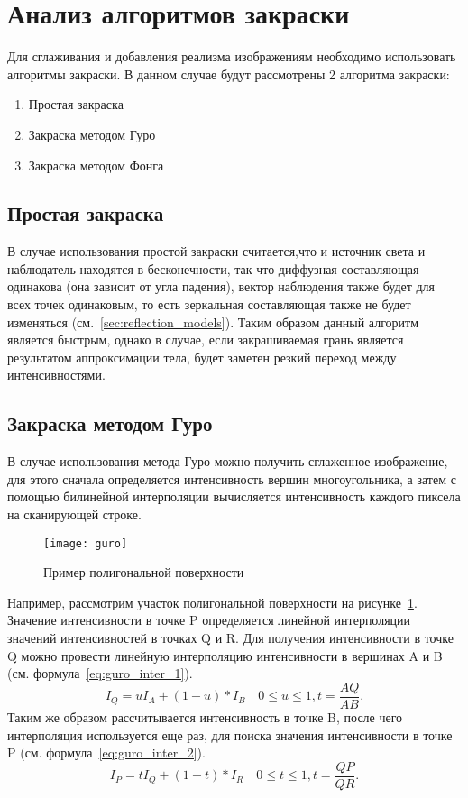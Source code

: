 \section{Анализ алгоритмов закраски}
Для сглаживания и добавления реализма изображениям  необходимо использовать алгоритмы закраски.
В данном случае будут рассмотрены 2 алгоритма закраски:
\begin{enumerate}
	\item Простая закраска
	\item Закраска методом Гуро
	\item Закраска методом Фонга
\end{enumerate}

\subsection{Простая закраска}
В случае использования простой закраски считается,что и источник света и наблюдатель находятся в бесконечности,
так что диффузная составляющая одинакова (она зависит от угла падения), вектор наблюдения также будет для всех точек одинаковым, то есть зеркальная составляющая
также не будет изменяться (см.~\ref{sec:reflection_models}). 
Таким образом данный алгоритм является быстрым, однако в случае, если закрашиваемая грань является результатом аппроксимации тела, 
будет заметен резкий переход между интенсивностями. \cite{Rodgers}


\subsection{Закраска методом Гуро}
В случае использования метода Гуро можно получить сглаженное изображение, для этого сначала определяется интенсивность вершин многоугольника, а
затем с помощью билинейной интерполяции вычисляется интенсивность каждого пиксела на сканирующей строке.

\begin{figure}[H]
	\centering
	\texttt{[image: guro]}
	\caption{Пример полигональной поверхности}
	\label{fig:guro_polygon}
\end{figure} 

Например, рассмотрим участок полигональной поверхности на рисунке~\ref{fig:guro_polygon}.
Значение интенсивности в точке P
определяется линейной интерполяции значений интенсивностей в точках Q и R.
Для получения интенсивности в точке Q можно провести линейную интерполяцию интенсивности в вершинах A и B (см. формула~\ref{eq:guro_inter_1}).
\begin{equation} 
	I_Q = uI_A+(1-u)*I_B  \quad 0 \leq u \leq 1, t = \frac{AQ}{AB}.
	\label{eq:guro_inter_1}
\end{equation}
Таким же образом рассчитывается интенсивность в точке B, после чего интерполяция используется еще раз, для поиска значения интенсивности в точке P 
(см. формула~\ref{eq:guro_inter_2}). \cite{Rodgers}
\begin{equation} 
	I_P = tI_Q+(1-t)*I_R  \quad 0 \leq t \leq 1, t = \frac{QP}{QR}.
	\label{eq:guro_inter_2}
\end{equation}


